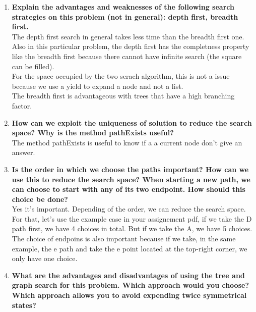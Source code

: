 \documentclass[10pt,a4paper]{article}
\begin{document}
\begin{enumerate}
	
	\item \textbf{ Explain the advantages and weaknesses of the following search strategies on this problem (not in general): depth first, breadth first.} \\
	
	The depth first search in general takes less time than the breadth first one. Also in this particular problem, the depth first has the completness property like the breadth first because there cannot have infinite search (the square can be filled). \\
	
	For the space occupied by the two serach algorithm, this is not a issue because we use a yield to expand a node and not a list. \\
	
	The breadth first is advantageous with trees that have a high branching factor.
	
	\item \textbf{How can we exploit the uniqueness of solution to reduce the search space? Why is the method pathExists useful?} \\
	
	The method pathExists is useful to know if a a current node don't give an answer. 
	
	\item \textbf{Is the order in which we choose the paths important? How can we use this to reduce the search space? When starting a new path, we can choose to start with any of its two endpoint. How should this choice be done?} \\
	
	Yes it's important. Depending of the order, we can reduce the search space. For that, let's use the example case in your assignement pdf, if we take the D path first, we have 4 choices in total. But if we take the A, we have 5 choices. \\
	
	The choice of endpoins is also important because if we take, in the same example, the e path and take the e point located at the top-right corner, we only have one choice. \\
	
	\item \textbf{What are the advantages and disadvantages of using the tree and graph search for this problem. Which approach would you choose? Which approach allows you to avoid expending twice symmetrical states?} \\
	

\end{enumerate}
\end{document}
